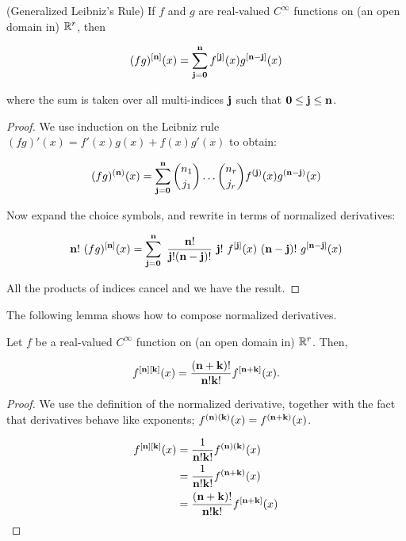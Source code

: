 \documentclass[11pt]{article}
\begin{document}
\begin{theorem}
{\rm (Generalized Leibniz's Rule)}
If $f$ and $g$ are real-valued $C^\infty$ functions on (an open domain in) $\mathbb{R}^r$, then

$$ (fg)^{[{\bf n}]}(x) = \sum_{{\bf j}={\bf 0}}^{\bf n} f^{[{\bf j}]}(x) g^{[{\bf n}-{\bf j}]}(x)  $$

where the sum is taken over all multi-indices ${\bf j}$ such that ${\bf 0}\leq{\bf j}\leq{\bf n}$.
\end{theorem}

\begin{proof}

We use induction on the Leibniz rule $(fg)'(x)=f'(x)g(x)+f(x)g'(x)$ to obtain:

$$
    (fg)^{({\bf n})}(x) = \sum_{{\bf j}={\bf 0}}^{\bf n} 
        {n_1\choose j_1} \dots {n_r\choose j_r} 
        f^{({\bf j})}(x) g^{({\bf n}-{\bf j})}(x) 
$$

Now expand the choice symbols, and rewrite in terms of normalized derivatives:


$$
{\bfn}!\ 
(fg)^{[{\bfn}]}(x) = 
\sum_{{\bf j}={\bf 0}}^{\bfn} \ 
{\bfn!\over \bfj!(\bfn-\bfj)!}\ 
{\bfj}!\ 
f^{[{\bf j}]}(x)\ 
{(\bfn-\bfj)}!\ 
g^{[{\bfn}-{\bfj}]}(x) 
$$

All the products of indices cancel and we have the result.

\end{proof}


The following lemma shows how to compose normalized derivatives.

\begin{lemma}
Let $f$ be a real-valued $C^\infty$ function on (an open domain in) $\mathbb{R}^r$. Then,

$$ f^{[\bf n][\bf k]}(x) = {(\bf n+\bf k)!\over \bf n!\bf k!} f^{[\bf n+\bf k]}(x). $$

\end{lemma}
\begin{proof}

We use the definition of the normalized derivative, 
together with the fact that derivatives behave like exponents;
$ f^{(\bf n)(\bf k)}(x) = f^{(\bf n+\bf k)}(x) $.


\begin{align*}
 f^{[\bf n][\bf k]}(x) &= {1\over \bf n!\bf k!} f^{(\bf n)(\bf k)}(x)  \\
                     &= {1\over \bf n!\bf k!} f^{(\bf n+\bf k)}(x)  \\
                     &= {(\bf n+\bf k)!\over \bf n!\bf k!} f^{[\bf n+\bf k]}(x) 
\end{align*}

\end{proof}
\end{document}

